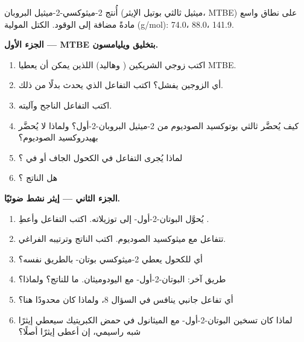 \begin{problem}
\label{pb:b1:alcohol-activation:1}
أُنتج 2-ميثوكسي-2-ميثيل البروبان (ميثيل ثالثي بوتيل الإيثر، MTBE) على
نطاق واسع مادةً مضافة إلى الوقود. الكتل المولية (\unit{g/mol}): 
74.0،  88.0،  141.9.

\medskip
\noindent\textbf{الجزء الأول --- MTBE بتخليق ويليامسون.}
\begin{enumerate}
  \item اكتب زوجي الشريكين ( وهاليد) اللذين يمكن أن
        يعطيا MTBE.
  \item أي الزوجين يفشل؟ اكتب التفاعل الذي يحدث بدلًا من ذلك.
  \item اكتب التفاعل الناجح وآليته.
  \item كيف يُحضَّر ثالثي بوتوكسيد الصوديوم من 2-ميثيل البروبان-2-أول؟
        ولماذا لا يُحضَّر بهيدروكسيد الصوديوم؟
  \item لماذا يُجرى التفاعل في الكحول الجاف أو في ؟
  \item هل الناتج ؟
\end{enumerate}

\medskip
\noindent\textbf{الجزء الثاني --- إيثر نشط ضوئيًا.}
\begin{enumerate}[resume]
  \item يُحوَّل البوتان-2-أول- إلى توزيلاته. اكتب
        التفاعل وأعطِ  .
  \item تتفاعل  مع ميثوكسيد الصوديوم. اكتب الناتج
        وترتيبه الفراغي.
  \item أي  للكحول يعطي 2-ميثوكسي بوتان-
        بالطريق نفسه؟
  \item طريق آخر:  البوتان-2-أول- مع
        اليودوميثان. ما  للناتج؟ ولماذا؟
  \item أي تفاعل جانبي ينافس في السؤال 8، ولماذا كان
        محدودًا هنا؟
  \item لماذا كان تسخين البوتان-2-أول- مع الميثانول في حمض
        الكبريتيك سيعطي إيثرًا شبه راسيمي، إن أعطى إيثرًا أصلًا؟
\end{enumerate}


\end{problem}
